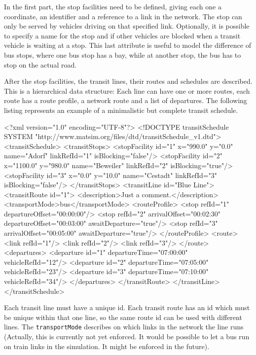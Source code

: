 In the first part, the stop facilities need to be defined, giving each one a coordinate, an identifier and a reference to a link in the network. The stop can only be served by vehicles driving on that specified link. Optionally, it is possible to specify a name for the stop and if other vehicles are blocked when a transit vehicle is waiting at a stop. This last attribute is useful to model \eg the difference of bus stops, where one bus stop has a bay, while at another stop, the bus has to stop on the actual road.

After the stop facilities, the transit lines, their routes and schedules are described. This is a hierarchical data structure: Each line can have one or more routes, each route has a route profile, a network route and a list of departures. The following listing represents an example of a minimalistic but complete transit schedule.
%
\begin{xml}
<?xml version="1.0" encoding="UTF-8"?> 
<!DOCTYPE transitSchedule SYSTEM "http://www.matsim.org/files/dtd/transitSchedule_v1.dtd"> 
<transitSchedule> 
   <transitStops> 
      <stopFacility id="1" x="990.0"  y="0.0"   name="Adorf" 
           linkRefId="1" isBlocking="false"/> 
      <stopFacility id="2" x="1100.0" y="980.0" name="Beweiler" 
           linkRefId="2" isBlocking="true"/> 
      <stopFacility id="3" x="0.0"    y="10.0"  name="Cestadt" 
           linkRefId="3" isBlocking="false"/> 
   </transitStops> 
   <transitLine id="Blue Line"> 
      <transitRoute id="1"> 
         <description>Just a comment.</description> 
         <transportMode>bus</transportMode> 
         <routeProfile> 
            <stop refId="1" departureOffset="00:00:00"/> 
            <stop refId="2" arrivalOffset="00:02:30" departureOffset="00:03:00" 
                                                     awaitDeparture="true"/> 
            <stop refId="3" arrivalOffset="00:05:00" awaitDeparture="true"/> 
         </routeProfile> 
         <route> 
            <link refId="1"/> 
            <link refId="2"/> 
            <link refId="3"/> 
         </route> 
         <departures> 
            <departure id="1" departureTime="07:00:00" vehicleRefId="12"/> 
            <departure id="2" departureTime="07:05:00" vehicleRefId="23"/> 
            <departure id="3" departureTime="07:10:00" vehicleRefId="34"/> 
         </departures> 
      </transitRoute> 
   </transitLine> 
</transitSchedule>
\end{xml}

Each transit line must have a unique id. Each transit route has an id which must be unique within that one line, so the same route id can be used with different lines. The \lstinline|transportMode| describes on which links in the network the line runs (Actually, this is currently not yet enforced. It would be possible to let a bus run on train links in the simulation. It might be enforced in the future).

